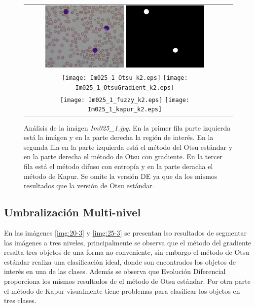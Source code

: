 \documentclass[preprint,12pt]{elsarticle}
\begin{document}
\begin{figure}[H]
\centering
\begin{tabular}{cc}
   \includegraphics[width=0.4\textwidth]{Im025_1.jpg}
   \includegraphics[width=0.4\textwidth]{Im025_1_Reference.jpg} \\
      \texttt{[image: Im025\_1\_Otsu\_k2.eps]}
   \texttt{[image: Im025\_1\_OtsuGradient\_k2.eps]} \\
      \texttt{[image: Im025\_1\_fuzzy\_k2.eps]}
   \texttt{[image: Im025\_1\_kapur\_k2.eps]}
\end{tabular}
\caption{Análisis de la imágen \textit{Im025\_1.jpg}. En la primer fila parte izquierda está la imágen y en la parte derecha la región de interés. En la segunda fila en la parte izquierda está el método del Otsu estándar y en la parte derecha el método de Otsu con gradiente. En la tercer fila está el método difuso con entropía y en la parte deracha el método de Kapur.  Se omite la versión DE ya que da los mismos resultados que la versión de Otsu estándar.}\label{img:25}
\end{figure}



\subsection{Umbralización Multi-nivel}

En las imágenes \ref{img:20-3} y \ref{img:25-3} se presentan lso resultados de segmentar las imágenes a tres niveles, principalmente se observa que el método del gradiente resalta tres objetos de una forma no conveniente, sin embargo el método de Otsu estándar realiza una clasificación ideal, donde son encontrados los objetos de interés en una de las clases.
%
Además se observa que Evolución Diferencial proporciona los mismos resultados de el método de Otsu estándar.
%
Por otra parte el método de Kapur visualmente tiene problemas para clasificar los objetos en tres clases.
%
\end{document}

